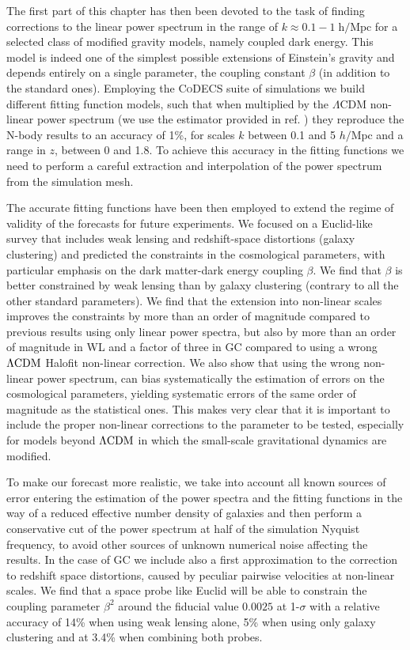 The first part of this chapter has then been devoted to the task of
finding corrections to the linear power spectrum in the range of $k\approx0.1-1 \;\mathrm{h/Mpc}$
for a selected class of modified gravity models, namely coupled dark
energy. This model is indeed one of the simplest possible extensions
of Einstein's gravity and depends entirely on a single parameter,
the coupling constant $\beta$ (in addition to the standard ones).
Employing the \textsc{CoDECS} suite of simulations \citep{baldi_codecs_2012}
we build different fitting function models, such that when multiplied
by the $\Lambda$CDM non-linear power spectrum (we use the estimator
provided in ref. \citep{heitmann_coyote_2014} ) they reproduce the
N-body results to an accuracy of 1\%, for scales $k$ between 0.1
and 5 $h/\mbox{Mpc}$ and a range in $z$, between 0 and 1.8. To achieve
this accuracy in the fitting functions we need to perform a careful
extraction and interpolation of the power spectrum from the simulation
mesh.

The accurate fitting functions have been then employed to extend the
regime of validity of the forecasts for future experiments. We focused
on a Euclid-like survey that includes weak lensing and redshift-space
distortions (galaxy clustering) and predicted the constraints in the
cosmological parameters, with particular emphasis on the dark matter-dark
energy coupling $\beta$. We find that $\beta$ is better constrained
by weak lensing than by galaxy clustering (contrary to all the other
standard parameters). We find that the extension into non-linear scales
improves the constraints by more than an order of magnitude compared
to previous results using only linear power spectra, but also by more
than an order of magnitude in WL and a factor of three in GC compared
to using a wrong $\Lambda\mathrm{CDM}$ Halofit non-linear correction. We also show
that using the wrong non-linear power spectrum, can bias systematically
the estimation of errors on the cosmological parameters, yielding
systematic errors of the same order of magnitude as the statistical
ones. This makes very clear that it is important to include the proper
non-linear corrections to the parameter to be tested, especially for
models beyond $\Lambda\mathrm{CDM}$ in which the small-scale gravitational dynamics
are modified.

To make our forecast more realistic, we take into account all known
sources of error entering the estimation of the power spectra and
the fitting functions in the way of a reduced effective number density
of galaxies and then perform a conservative cut of the power spectrum
at half of the simulation Nyquist frequency, to avoid other sources
of unknown numerical noise affecting the results. In the case of GC
we include also a first approximation to the correction to redshift
space distortions, caused by peculiar pairwise velocities at non-linear
scales. We find that a space probe like Euclid will be able to constrain
the coupling parameter $\beta^{2}$ around the fiducial value $0.0025$
at 1-$\sigma$ with a relative accuracy of 14\% when using weak lensing
alone, 5\% when using only galaxy clustering and at 3.4\% when combining
both probes.

